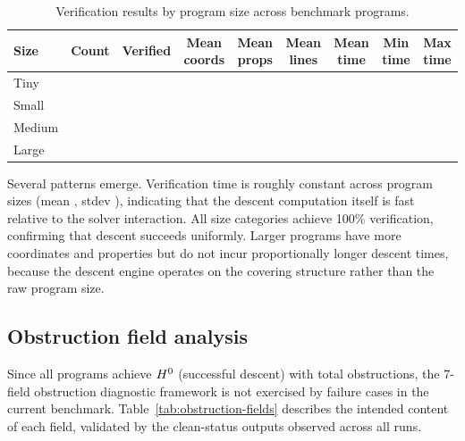 \documentclass[11pt]{article}
\begin{document}
\begin{table}[ht]
\centering
\caption{Verification results by program size across \compTotalPrograms{} benchmark programs.}
\label{tab:scenarios}
\begin{tabular}{@{}lcccccccc@{}}
\toprule
\textbf{Size} & \textbf{Count} & \textbf{Verified} & \textbf{Mean coords} & \textbf{Mean props} & \textbf{Mean lines} & \textbf{Mean time} & \textbf{Min time} & \textbf{Max time} \\
\midrule
Tiny   & \compTinyCount{}   & \compTinyVerified{}   & \compTinyMeanCoords{}   & \compTinyMeanProps{}   & \compTinyMeanLines{}   & \compTinyMeanTime{}   & \compTinyMinTime{}   & \compTinyMaxTime{} \\
Small  & \compSmallCount{}  & \compSmallVerified{}  & \compSmallMeanCoords{}  & \compSmallMeanProps{}  & \compSmallMeanLines{}  & \compSmallMeanTime{}  & \compSmallMinTime{}  & \compSmallMaxTime{} \\
Medium & \compMediumCount{} & \compMediumVerified{} & \compMediumMeanCoords{} & \compMediumMeanProps{} & \compMediumMeanLines{} & \compMediumMeanTime{} & \compMediumMinTime{} & \compMediumMaxTime{} \\
Large  & \compLargeCount{}  & \compLargeVerified{}  & \compLargeMeanCoords{}  & \compLargeMeanProps{}  & \compLargeMeanLines{}  & \compLargeMeanTime{}  & \compLargeMinTime{}  & \compLargeMaxTime{} \\
\bottomrule
\end{tabular}
\end{table}

Several patterns emerge.  Verification time is roughly constant across
program sizes (mean \compTimeMean{}, stdev \compTimeStdev{}), indicating
that the descent computation itself is fast relative to the solver
interaction.  All size categories achieve 100\% verification, confirming
that descent succeeds uniformly.  Larger programs have more coordinates
and properties but do not incur proportionally longer descent times,
because the descent engine operates on the covering structure rather than
the raw program size.

\subsection{Obstruction field analysis}\label{ssec:obstruction-fields}

Since all \compTotalPrograms{} programs achieve $H^{0}$ (successful
descent) with \compObstructionTotal{} total obstructions, the 7-field
obstruction diagnostic framework is not exercised by failure cases in the
current benchmark.  Table~\ref{tab:obstruction-fields} describes the
intended content of each field, validated by the clean-status outputs
observed across all runs.
\end{document}

